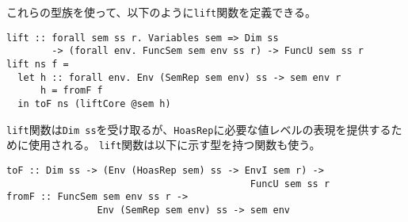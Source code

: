 \documentclass[uplatex]{sumiilab-paper}
\theoremstyle{mystyle}
\newtheorem{definition}{定義}
\newtheorem{theorem}[definition]{定理}
\newtheorem{corollary}[definition]{系}
\newtheorem{proposition}[definition]{命題}
\newtheorem{lemma}[definition]{補題}
\newtheorem{example}[definition]{例}
\newtheorem{assumption}[definition]{仮定}
\numberwithin{definition}{chapter} %
\begin{document}
これらの型族を使って、以下のように{\tt lift}関数を定義できる。

\begin{lstlisting}[caption=liftCorenの定義,label=src:haskell_liftCore]
lift :: forall sem ss r. Variables sem => Dim ss
        -> (forall env. FuncSem sem env ss r) -> FuncU sem ss r
lift ns f =
  let h :: forall env. Env (SemRep sem env) ss -> sem env r
      h = fromF f
  in toF ns (liftCore @sem h)
\end{lstlisting}

{\tt lift}関数は{\tt Dim ss}を受け取るが、{\tt HoasRep}に必要な値レベルの表現を提供するために使用される。
{\tt lift}関数は以下に示す型を持つ関数も使う。

\begin{lstlisting}[caption=toFの定義,label=src:haskell_toF]
toF :: Dim ss -> (Env (HoasRep sem) ss -> EnvI sem r) -> 
                                           FuncU sem ss r
fromF :: FuncSem sem env ss r -> 
                Env (SemRep sem env) ss -> sem env 
\end{lstlisting}









\end{document}
